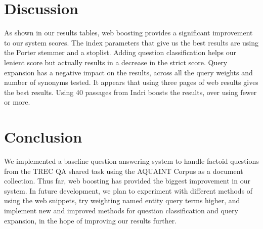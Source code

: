 \documentclass[11pt]{article}
\begin{document}
\section{Discussion}

As shown in our results tables, web boosting provides a significant improvement to our system scores.  The index parameters that give us the best results are using the Porter stemmer and a stoplist.  Adding question classification helps our lenient score but actually results in a decrease in the strict score.  Query expansion has a negative impact on the results, across all the query weights and number of synonyms tested.  It appears that using three pages of web results gives the best results.  Using 40 passages from Indri boosts the results, over using fewer or more.

\section{Conclusion}

We implemented a baseline question answering system to handle factoid questions from the TREC QA shared task using the AQUAINT Corpus as a document collection. Thus far, web boosting has provided the biggest improvement in our system. In future development, we plan to experiment with different methods of using the web snippets, try weighting named entity query terms higher, and implement new and improved methods for question classification and query expansion, in the hope of improving our results further.

\nocite{*}




\end{document}
